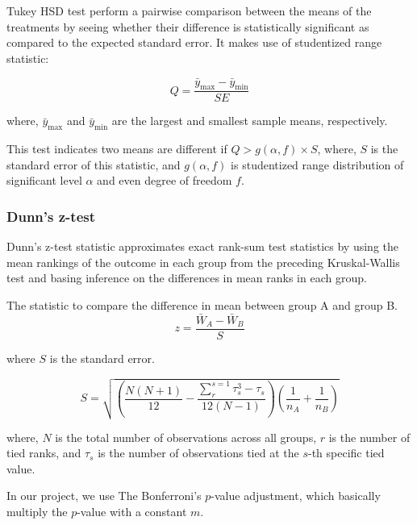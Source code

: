 Tukey HSD test perform a pairwise comparison between the means of the treatments by seeing whether their difference
is statistically significant as compared to the expected standard error. It makes use of studentized range statistic:

\begin{equation}
    Q = \frac{\bar{y}_{\text{max}} - \bar{y}_{\text{min}}}{SE}
\end{equation}

where, $\bar{y}_{\text{max}}$ and $\bar{y}_{\text{min}}$
are the largest and smallest sample means, respectively.

This test indicates two means are different if $Q > g(\alpha,f)\times S$\cite{tukey},
where, $S$ is the standard error of this statistic, and $g(\alpha,f)$ is studentized range 
distribution of significant level $\alpha$ and even degree of freedom $f$.

\subsubsection{Dunn's z-test}

Dunn's z-test statistic approximates exact rank-sum test statistics by using the
mean rankings of the outcome in each group from the preceding Kruskal-Wallis test
and basing inference on the differences in mean ranks in each group.\cite{dinno15}

The statistic to compare the difference in mean between group A and group B.
\begin{equation}
    z = \frac{\bar{W}_A - \bar{W}_B}{S}
\end{equation}

where $S$ is the standard error.

\begin{equation}
    S = \sqrt{(\frac{N(N+1)}{12} - \frac{\sum^{s=1}_{r} \tau^3_{s} - \tau_s}{12(N-1)})(\frac{1}{n_A} + \frac{1}{n_B})}
\end{equation}

where, $N$ is the total number of observations across all groups, $r$ is the number of tied
ranks, and $\tau_s$ is the number of observations tied at the $s$-th specific tied value.

In our project, we use The Bonferroni's $p$-value adjustment, which basically multiply the $p$-value with a constant $m$.